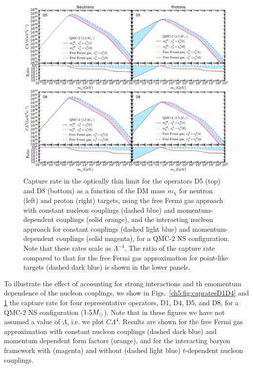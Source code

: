\begin{figure}[t!bp] 
\centering
\includegraphics[width=\textwidth]{capture_3/C_mDM_N_QMC_D5_D8_ratio.pdf}
\caption[Capture rate in the optically thin limit for the operators D5 (top) and D8 (bottom) as a function of the DM mass $m_\chi$ for neutron (left) and proton (right) targets, for a QMC-2 NS configuration.]{
Capture rate in the optically thin limit for the operators D5 (top) and D8 (bottom) as a function of the DM mass $m_\chi$ for neutron (left) and proton (right) targets,
using the free Fermi gas approach with constant nucleon couplings (dashed blue) and momentum-dependent couplings (solid orange), and the interacting nucleon approach for constant couplings (dashed light blue)  and momentum-dependent couplings (solid magenta), for a QMC-2 NS configuration. 
Note that these rates scale as $\Lambda^{-4}$. 
The ratio of the capture rate compared to that for the free Fermi gas approximation for point-like targets (dashed dark blue) is shown in the lower panels. 
}
\label{ch5:fig:capratesD5D8}
\end{figure} 

To illustrate the effect of accounting for strong interactions and th emomentum dependence of the nucleon couplings, we show in  Figs.~\ref{ch5:fig:capratesD1D4} and \ref{ch5:fig:capratesD5D8} the capture rate for four representative operators, D1, D4, D5, and D8, for a QMC-2 NS configuration ($1.5M_\odot$). 
Note that in these figures we have not assumed a value of $\Lambda$, i.e. we plot $C \Lambda^4$. 
Results are shown for the free Fermi gas approximation with constant nucleon couplings (dashed dark blue) and momentum dependent form factors (orange), and for the interacting baryon framework with (magenta) and without (dashed light blue) $t$-dependent nucleon couplings.
 

